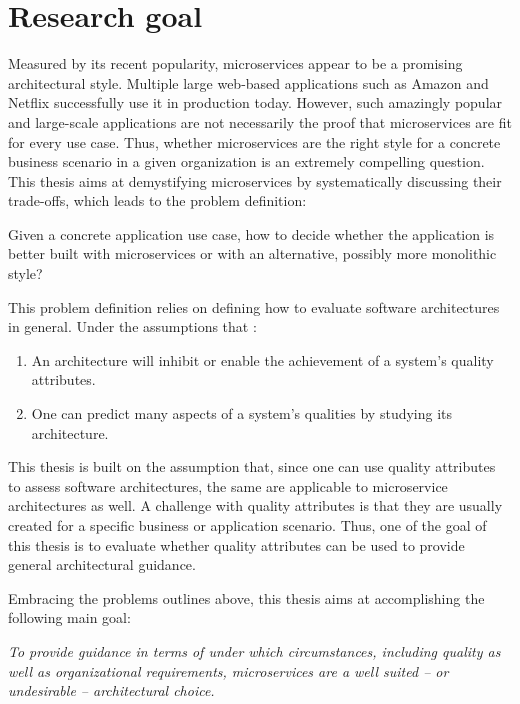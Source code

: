 \section{Research goal}
\label{intro:goal}

Measured by its recent popularity, microservices appear to be a promising architectural style.
Multiple large web-based applications such as Amazon and Netflix successfully use it in production today.
However, such amazingly popular and large-scale applications are not necessarily the proof that microservices are fit for every use case.
Thus, whether microservices are the right style for a concrete business scenario in a given organization is an extremely compelling question.
This thesis aims at demystifying microservices by systematically discussing their trade-offs, which leads to the problem definition:

\begin{addmargin}[2em]{2em}
Given a concrete application use case, how to decide whether the application is better built with microservices or with an alternative, possibly more monolithic style?
\end{addmargin}

This problem definition relies on defining how to evaluate software architectures in general.
Under the assumptions that \citep[p. 40]{Bass2012}:
\begin{enumerate}
\item An architecture will inhibit or enable the achievement of a system's quality attributes.
\item One can predict many aspects of a system's qualities by studying its architecture.
\end{enumerate}
This thesis is built on the assumption that, since one can use quality attributes to assess software architectures, the same are applicable to microservice architectures as well.
A challenge with quality attributes is that they are usually created for a specific business or application scenario.
Thus, one of the goal of this thesis is to evaluate whether quality attributes can be used to provide general architectural guidance.

Embracing the problems outlines above, this thesis aims at accomplishing the following main goal:
\begin{addmargin}[2em]{2em}
\textit{To provide guidance in terms of under which circumstances, including quality as well as organizational requirements, microservices are a well suited -- or undesirable -- architectural choice.}
\end{addmargin}

